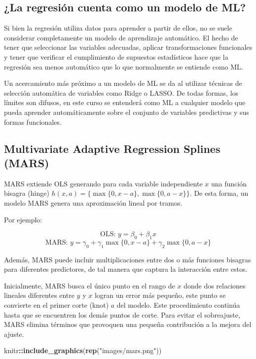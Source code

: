 \documentclass[
]{book}
\newenvironment{Shaded}{\begin{snugshade}}{\end{snugshade}}
\newcommand{\FunctionTok}[1]{\textcolor[rgb]{0.13,0.29,0.53}{\textbf{#1}}}
\newcommand{\NormalTok}[1]{#1}
\newcommand{\SpecialCharTok}[1]{\textcolor[rgb]{0.81,0.36,0.00}{\textbf{#1}}}
\newcommand{\StringTok}[1]{\textcolor[rgb]{0.31,0.60,0.02}{#1}}
\begin{document}
\subsection{¿La regresión cuenta como un modelo de ML?}\label{la-regresiuxf3n-cuenta-como-un-modelo-de-ml}

Si bien la regresión utiliza datos para aprender a partir de ellos, no
se suele considerar completamente un modelo de aprendizaje automático.
El hecho de tener que seleccionar las variables adecuadas, aplicar
transformaciones funcionales y tener que verificar el cumplimiento de
supuestos estadísticos hace que la regresión sea menos automático que lo
que normalmente se entiende como ML.

Un acercamiento más próximo a un modelo de ML se da al utilizar técnicas
de selección automática de variables como Ridge o LASSO. De todas
formas, los límites son difusos, en este curso se entenderá como ML a
cualquier modelo que pueda aprender automáticamente sobre el conjunto de
variables predictivas y sus formas funcionales.

\subsection{Multivariate Adaptive Regression Splines (MARS)}\label{multivariate-adaptive-regression-splines-mars}

MARS extiende OLS generando para cada variable independiente \(x\) una
función bisagra (hinge)
\(h(x, a) = \{ \max\{0, x-a\},  \max\{0, a-x\} \}\). De esta forma, un
modelo MARS genera una aproximación lineal por tramos.

Por ejemplo:

\[\text{OLS: }y = \beta_0 + \beta_1 x\]
\[\text{MARS: }y = \gamma_0 + \gamma_1 \max\{0, x-a\} + \gamma_2 \max\{0, a-x\}\]

Además, MARS puede incluir multiplicaciones entre dos o más funciones
bisagras para diferentes predictores, de tal manera que captura la
interacción entre estos.

Inicialmente, MARS busca el único punto en el rango de \(x\) donde dos
relaciones lineales diferentes entre \(y\) y \(x\) logran un error más
pequeño, este punto se convierte en el primer corte (knot) \(a\) del
modelo. Este procedimiento continúa hasta que se encuentren los demás
puntos de corte. Para evitar el sobreajuste, MARS elimina términos que
provoquen una pequeña contribución a la mejora del ajuste.

\begin{Shaded}
\begin{Highlighting}[]
\NormalTok{knitr}\SpecialCharTok{::}\FunctionTok{include\_graphics}\NormalTok{(}\FunctionTok{rep}\NormalTok{(}\StringTok{"images/mars.png"}\NormalTok{))}
\end{Highlighting}
\end{Shaded}
\end{document}
